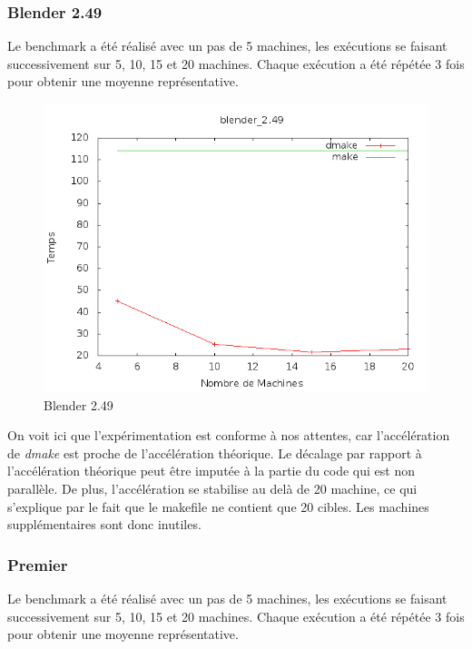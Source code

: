 \documentclass[a4paper,12pt,twoside]{article}
\begin{document}
\subsubsection{Blender 2.49}

Le benchmark a été réalisé avec un pas de 5 machines, les exécutions
se faisant successivement sur 5, 10, 15 et 20 machines. Chaque
exécution a été répétée 3 fois pour obtenir une moyenne
représentative.

\begin{figure}[H]
  \centering
  \includegraphics[scale=0.5]{benchmark_blender_2_49_01.png}
  \caption{Blender 2.49}
  \label{fig:blender249}
\end{figure}

On voit ici que l'expérimentation est conforme à nos attentes, car
l'accélération de \emph{dmake} est proche de l'accélération
théorique. Le décalage par rapport à l'accélération théorique peut
être imputée à la partie du code qui est non parallèle. De plus,
l'accélération se stabilise au delà de 20 machine, ce qui s'explique
par le fait que le makefile ne contient que 20 cibles. Les machines
supplémentaires sont donc inutiles. 

\subsubsection{Premier}

Le benchmark a été réalisé avec un pas de 5 machines, les exécutions
se faisant successivement sur 5, 10, 15 et 20 machines. Chaque
exécution a été répétée 3 fois pour obtenir une moyenne
représentative.
\end{document}
